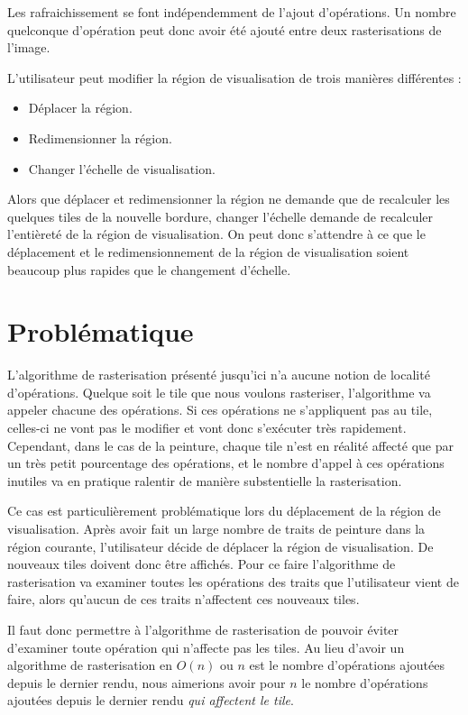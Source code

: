 			Les rafraichissement se font indépendemment de l'ajout d'opérations. Un nombre quelconque
			d'opération peut donc avoir été ajouté entre deux rasterisations de l'image.

			L'utilisateur peut modifier la région de visualisation de trois manières différentes :

			\begin{itemize}
				\item Déplacer la région.
				\item Redimensionner la région.
				\item Changer l'échelle de visualisation.
			\end{itemize}

			Alors que déplacer et redimensionner la région ne demande que de recalculer les quelques tiles de la nouvelle
			bordure, changer l'échelle demande de recalculer l'entièreté de la région de visualisation. On peut
			donc s'attendre à ce que le déplacement et le redimensionnement de la région de visualisation soient 
			beaucoup plus rapides que le changement d'échelle.

	\section{Problématique}
		L'algorithme de rasterisation présenté jusqu'ici n'a aucune notion de localité d'opérations. Quelque soit le tile
		que nous voulons rasteriser, l'algorithme va appeler chacune des opérations. Si ces opérations ne s'appliquent pas
		au tile, celles-ci ne vont pas le modifier et vont donc s'exécuter très rapidement. Cependant, dans le cas de la 
		peinture, chaque tile n'est en réalité affecté que par un très petit pourcentage des opérations, et le nombre
		d'appel à ces opérations inutiles va en pratique ralentir de manière substentielle la rasterisation.

		Ce cas est particulièrement problématique lors du déplacement de la région de visualisation. Après avoir fait
		un large nombre de traits de peinture dans la région courante, l'utilisateur décide de déplacer la région de
		visualisation. De nouveaux tiles doivent donc être affichés. Pour ce faire l'algorithme de rasterisation va 
		examiner toutes les opérations des traits que l'utilisateur vient de faire, alors qu'aucun de ces traits n'affectent
		ces nouveaux tiles. 

		Il faut donc permettre à l'algorithme de rasterisation de pouvoir éviter d'examiner toute opération qui n'affecte
		pas les tiles. Au lieu d'avoir un algorithme de rasterisation en $O(n)$ ou $n$ est le nombre d'opérations
		ajoutées depuis le dernier rendu, nous aimerions avoir pour $n$ le nombre d'opérations ajoutées depuis le dernier
		rendu \emph{qui affectent le tile}.

